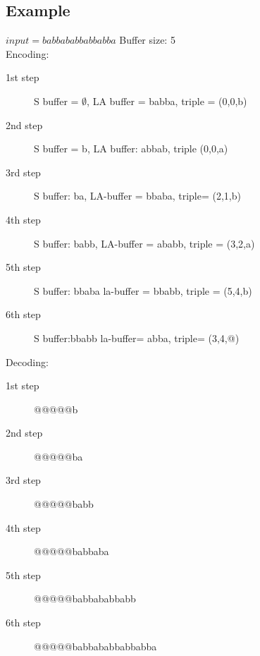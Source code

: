     \subsection{Example}
    $input = babbababbabbabba $ Buffer size: 5\\
    Encoding:
    \begin{description}
        \item[1st step] S buffer = $\emptyset$, LA buffer = babba, triple = (0,0,b)
        \item[2nd step] S buffer = b, LA buffer: abbab, triple (0,0,a)
        \item[3rd step] S buffer: ba, LA-buffer = bbaba, triple= (2,1,b)
        \item[4th step] S buffer: babb, LA-buffer = ababb, triple = (3,2,a)
        \item[5th step] S buffer: bbaba la-buffer = bbabb, triple = (5,4,b)
        \item[6th step] S buffer:bbabb la-buffer= abba, triple= (3,4,@)
    \end{description}
    Decoding:
    \begin{description}
        \item[1st step] @@@@@b
        \item[2nd step] @@@@@ba
        \item[3rd step] @@@@@babb
        \item[4th step] @@@@@babbaba
        \item[5th step] @@@@@babbababbabb
        \item[6th step] @@@@@babbababbabbabba
    \end{description}
    

    